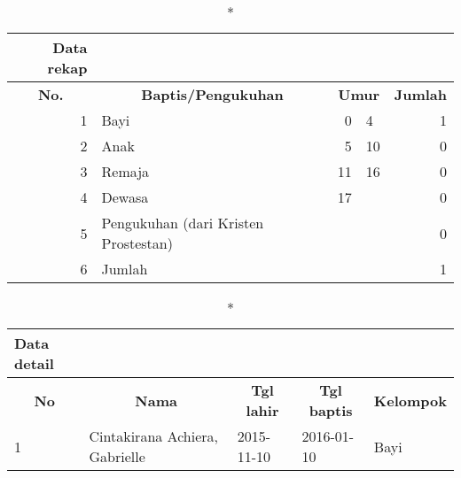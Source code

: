  \begin{longtable}{|r|l|r@{$-$}l|r|} 
	\caption*{Data rekap} \\
	\hline \multicolumn{1}{|c|}{\textbf{No.}} & 
	\multicolumn{1}{|c|}{\textbf{Baptis/Pengukuhan}} &
	\multicolumn{2}{c}{\textbf{Umur}} & \multicolumn{1}{|c|}{\textbf{Jumlah}} \\
	\hline \hline  \endfirsthead 
	
	1&Bayi&0&4&1\\ \hline 
	2&Anak&5&10&0\\ \hline 
	3&Remaja&11&16&0\\ \hline 
	4&Dewasa&17&&0\\ \hline 
	5&Pengukuhan (dari Kristen Prostestan)&& &0\\ \hline 
	6&Jumlah&&&1\\ \hline 
\end{longtable}


\begin{longtable}{|l|m{60mm}|l|l|l|}
	\caption*{Data detail} \\
	\hline \hline 
	\multicolumn{1}{|c|}{\textbf{No}} & 
	\multicolumn{1}{|c|}{\textbf{Nama}} & 
	\multicolumn{1}{|c|}{\textbf{Tgl lahir}} &
	\multicolumn{1}{|c|}{\textbf{Tgl baptis}} &
	\multicolumn{1}{|c|}{\textbf{Kelompok}} 
	\\ \hline \hline  
	\endfirsthead
	
	1&Cintakirana Achiera, Gabrielle&2015-11-10&2016-01-10&Bayi\\ \hline 
\end{longtable}